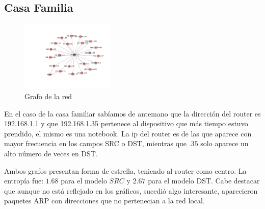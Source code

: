 \subsection{Casa Familia}

\begin{figure}
\vspace{-35pt}
\hspace{-35pt}
\centering
   \includegraphics[width=0.4\textwidth]{resultados/casa/conectividadNX.pdf}
\vspace{-30pt}
   \caption{Grafo de la red}
\end{figure}


En el caso de la casa familiar sab\'iamos de antemano que la direcci\'on del router
es 192.168.1.1 y que 192.168.1.35 pertenece al dispositivo que m\'as tiempo estuvo
prendido, el mismo es una notebook. La ip del router es de las que aparece con mayor
frecuencia en los campos SRC o DST, mientras que $.35$ solo aparece un alto n\'umero
de veces en DST. 

Ambos grafos presentan forma de estrella, teniendo al router como centro. 
La entrop\'ia fue: $1.68$ para el modelo $SRC$ y $2.67$ para el modelo DST.
Cabe destacar que aunque no est\'a reflejado en los gr\'aficos, sucedi\'o algo interesante, 
aparecieron paquetes ARP con direcciones que no pertenecian a la red local.

~

~

~

